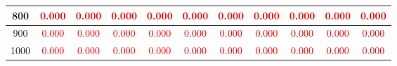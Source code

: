 \documentclass[12]{beamer}
\begin{document}
\begin{frame}
\begin{center}
\begin{adjustbox}{max width=\textwidth}
\begin{tabular}{ |c|c|c|c|c|c|c|c|c|c|c|}
\hline
 800 &\textcolor{red}{0.000} &\textcolor{red}{0.000} &\textcolor{red}{0.000} &\textcolor{red}{0.000} &\textcolor{red}{0.000} &\textcolor{red}{0.000} &\textcolor{red}{0.000} &\textcolor{red}{0.000} &\textcolor{red}{0.000} &\textcolor{red}{0.000} \\ 
\hline
 900 &\textcolor{red}{0.000} &\textcolor{red}{0.000} &\textcolor{red}{0.000} &\textcolor{red}{0.000} &\textcolor{red}{0.000} &\textcolor{red}{0.000} &\textcolor{red}{0.000} &\textcolor{red}{0.000} &\textcolor{red}{0.000} &\textcolor{red}{0.000} \\ 
\hline
 1000 &\textcolor{red}{0.000} &\textcolor{red}{0.000} &\textcolor{red}{0.000} &\textcolor{red}{0.000} &\textcolor{red}{0.000} &\textcolor{red}{0.000} &\textcolor{red}{0.000} &\textcolor{red}{0.000} &\textcolor{red}{0.000} &\textcolor{red}{0.000} \\ 
\hline
\end{tabular}
\end{adjustbox}
\end{center}

\end{frame}
\end{document}
